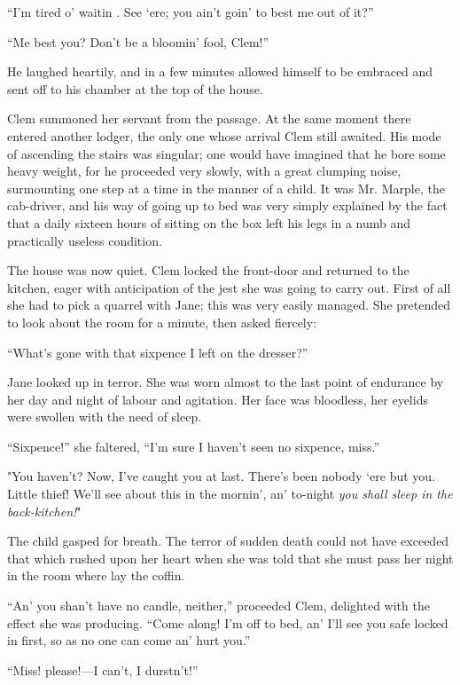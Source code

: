 ``I'm tired o' waitin . See `ere; you ain't goin' to best me out of
it?''

``Me best you? Don't be a bloomin' fool, Clem!''

He laughed heartily, and in a few minutes allowed himself to be embraced
and sent off to his chamber at the top of the house.

{\protect\hypertarget{86}{}{}}Clem summoned her servant from the
passage. At the same moment there entered another lodger, the only one
whose arrival Clem still awaited. His mode of ascending the stairs was
singular; one would have imagined that he bore some heavy weight, for he
proceeded very slowly, with a great clumping noise, surmounting one step
at a time in the manner of a child. It was Mr. Marple, the cab-driver,
and his way of going up to bed was very simply explained by the fact
that a daily sixteen hours of sitting on the box left his legs in a numb
and practically useless condition.

The house was now quiet. Clem locked the front-door and returned to the
kitchen, eager with anticipation of the jest she was going to carry out.
First of all she had to pick a quarrel with Jane; this was very easily
managed. She pretended to look about the room for a minute, then asked
fiercely:

``What's gone with that sixpence I left on the dresser?''

Jane looked up in terror. She was worn
{\protect\hypertarget{87}{}{}}almost to the last point of endurance by
her day and night of labour and agitation. Her face was bloodless, her
eyelids were swollen with the need of sleep.

``Sixpence!'' she faltered, ``I'm sure I haven't seen no sixpence,
miss.''

"You haven't? Now, I've caught you at last. There's been nobody `ere but
you. Little thief! We'll see about this in the mornin', an' to-night
\emph{you shall sleep in the back-kitchen!}"

The child gasped for breath. The terror of sudden death could not have
exceeded that which rushed upon her heart when she was told that she
must pass her night in the room where lay the coffin.

``An' you shan't have no candle, neither,'' proceeded Clem, delighted
with the effect she was producing. ``Come along! I'm off to bed, an'
I'll see you safe locked in first, so as no one can come an' hurt you.''

``Miss! please!---I can't, I durstn't!''

